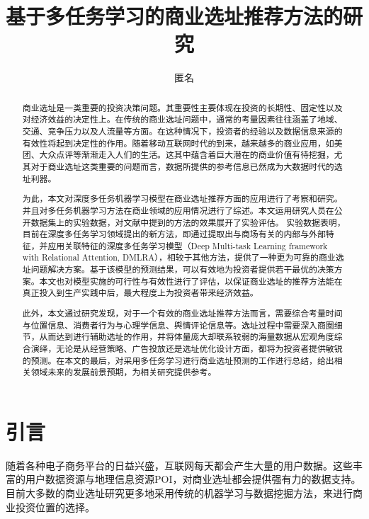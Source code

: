 \documentclass{llncs}
\begin{document}
	
\title{基于多任务学习的商业选址推荐方法的研究}
\author{匿名}
\maketitle

\begin{abstract}
商业选址是一类重要的投资决策问题。其重要性主要体现在投资的长期性、固定性以及对经济效益的决定性上。在传统的商业选址问题中，通常的考量因素往往涵盖了地域、交通、竞争压力以及人流量等方面。在这种情况下，投资者的经验以及数据信息来源的有效性将起到决定性的作用。随着移动互联网时代的到来，越来越多的商业应用，如美团、大众点评等渐渐走入人们的生活。这其中蕴含着巨大潜在的商业价值有待挖掘，尤其对于商业选址这类重要的问题而言，数据所提供的参考信息已然成为大数据时代的选址利器。

为此，本文对深度多任务机器学习模型在商业选址推荐方面的应用进行了考察和研究。并且对多任务机器学习方法在商业领域的应用情况进行了综述。本文运用研究人员在公开数据集上的实验数据，对文献中提到的方法的效果展开了实验评估。
实验数据表明，目前在深度多任务学习领域提出的新方法，即通过提取出与商场有关的内部与外部特征，并应用关联特征的深度多任务学习模型（Deep Multi-task Learning framework with Relational Attention, DMLRA），相较于其他方法，提供了一种更为可靠的商业选址问题解决方案。基于该模型的预测结果，可以有效地为投资者提供若干最优的决策方案。本文也对模型实施的可行性与有效性进行了评估，以保证商业选址的推荐方法能在真正投入到生产实践中后，最大程度上为投资者带来经济效益。

此外，本文通过研究发现，对于一个有效的商业选址推荐方法而言，需要综合考量时间与位置信息、消费者行为与心理学信息、舆情评论信息等。选址过程中需要深入商圈细节，从而达到进行辅助选址的作用，并将体量庞大却联系较弱的海量数据从宏观角度综合演绎，无论是从经营策略、广告投放还是选址优化设计方面，都将为投资者提供敏锐的预测。在本文的最后，对采用多任务学习进行商业选址预测的工作进行总结，给出相关领域未来的发展前景预期，为相关研究提供参考。

\end{abstract}

\section{引言}
随着各种电子商务平台的日益兴盛，互联网每天都会产生大量的用户数据。这些丰富的用户数据资源与地理信息资源POI，对商业选址都会提供强有力的数据支持。目前大多数的商业选址研究更多地采用传统的机器学习与数据挖掘方法，来进行商业投资位置的选择。
\end{document}
